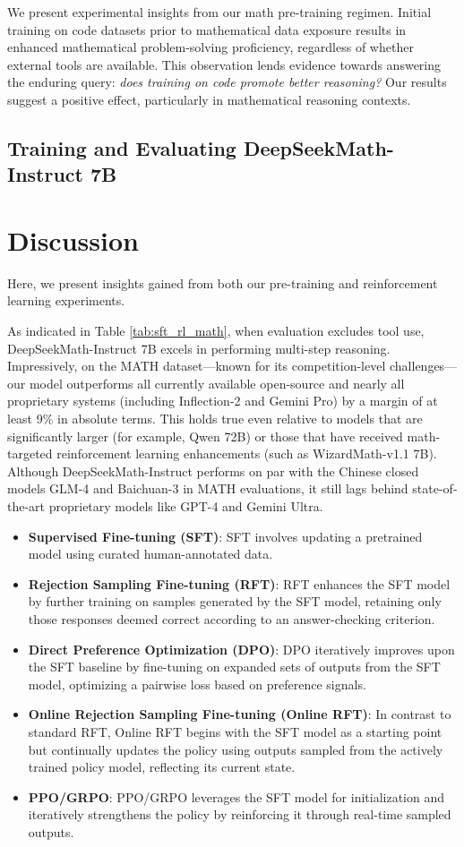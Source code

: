 {    \item We present experimental insights from our math pre-training regimen. Initial training on code datasets prior to mathematical data exposure results in enhanced mathematical problem-solving proficiency, regardless of whether external tools are available. This observation lends evidence towards answering the enduring query: \textit{does training on code promote better reasoning?} Our results suggest a positive effect, particularly in mathematical reasoning contexts.

\subsection{Training and Evaluating DeepSeekMath-Instruct 7B}

\section{Discussion}
Here, we present insights gained from both our pre-training and reinforcement learning experiments.

As indicated in Table \ref{tab:sft_rl_math}, when evaluation excludes tool use, DeepSeekMath-Instruct 7B excels in performing multi-step reasoning. Impressively, on the MATH dataset—known for its competition-level challenges—our model outperforms all currently available open-source and nearly all proprietary systems (including Inflection-2 and Gemini Pro) by a margin of at least 9\% in absolute terms. This holds true even relative to models that are significantly larger (for example, Qwen 72B) or those that have received math-targeted reinforcement learning enhancements (such as WizardMath-v1.1 7B). Although DeepSeekMath-Instruct performs on par with the Chinese closed models GLM-4 and Baichuan-3 in MATH evaluations, it still lags behind state-of-the-art proprietary models like GPT-4 and Gemini Ultra.

\begin{itemize}
    \item  \textbf{Supervised Fine-tuning (SFT)}: SFT involves updating a pretrained model using curated human-annotated data.
    \item \textbf{Rejection Sampling Fine-tuning (RFT)}: RFT enhances the SFT model by further training on samples generated by the SFT model, retaining only those responses deemed correct according to an answer-checking criterion.
    \item \textbf{Direct Preference Optimization (DPO)}: DPO iteratively improves upon the SFT baseline by fine-tuning on expanded sets of outputs from the SFT model, optimizing a pairwise loss based on preference signals.
    \item \textbf{Online Rejection Sampling Fine-tuning (Online RFT)}: In contrast to standard RFT, Online RFT begins with the SFT model as a starting point but continually updates the policy using outputs sampled from the actively trained policy model, reflecting its current state.
    \item \textbf{PPO/GRPO}: PPO/GRPO leverages the SFT model for initialization and iteratively strengthens the policy by reinforcing it through real-time sampled outputs.
\end{itemize}

}
